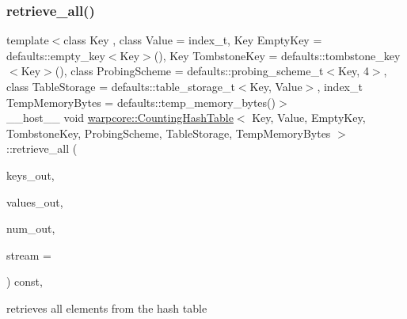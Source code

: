 \subsubsection{\texorpdfstring{retrieve\+\_\+all()}{retrieve\_all()}}
{\footnotesize\ttfamily template$<$class Key , class Value  = index\+\_\+t, Key Empty\+Key = defaults\+::empty\+\_\+key$<$\+Key$>$(), Key Tombstone\+Key = defaults\+::tombstone\+\_\+key$<$\+Key$>$(), class Probing\+Scheme  = defaults\+::probing\+\_\+scheme\+\_\+t$<$\+Key, 4$>$, class Table\+Storage  = defaults\+::table\+\_\+storage\+\_\+t$<$\+Key, Value$>$, index\+\_\+t Temp\+Memory\+Bytes = defaults\+::temp\+\_\+memory\+\_\+bytes()$>$ \\
\+\_\+\+\_\+host\+\_\+\+\_\+ void \hyperlink{classwarpcore_1_1CountingHashTable}{warpcore\+::\+Counting\+Hash\+Table}$<$ Key, Value, Empty\+Key, Tombstone\+Key, Probing\+Scheme, Table\+Storage, Temp\+Memory\+Bytes $>$\+::retrieve\+\_\+all (\begin{DoxyParamCaption}\item[{key\+\_\+type $\ast$}]{keys\+\_\+out,  }\item[{value\+\_\+type $\ast$}]{values\+\_\+out,  }\item[{index\+\_\+t \&}]{num\+\_\+out,  }\item[{cuda\+Stream\+\_\+t}]{stream = {} }\end{DoxyParamCaption}) const\hspace{0.3cm}{\ttfamily [inline]}, {\ttfamily [noexcept]}}



retrieves all elements from the hash table 


